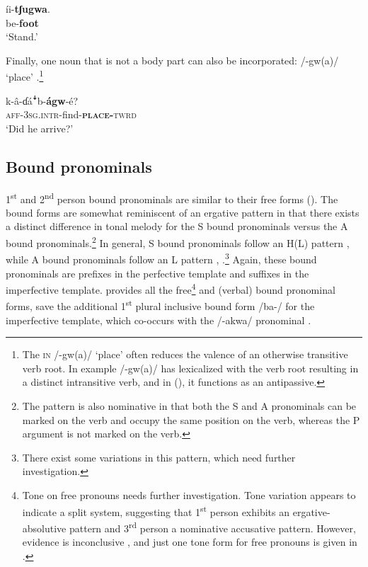 \documentclass[output=paper]{langsci/langscibook}
\begin{document}
\ea\label{ex:ahlandc:14}
\gll
íi-\textbf{tʃugwa}. \\
be{}-\textbf{foot} \\
\glt
‘Stand.’
\z

Finally, one noun that is not a body part can also be incorporated: /-gw(a)/ ‘place' .\footnote{The \textsc{in }/-gw(a)/ ‘place’ often reduces the valence of an otherwise transitive verb root. In example  /-gw(a)/ has lexicalized with the verb root resulting in a distinct intransitive verb, and in  (), it functions as an antipassive.}

\ea\label{ex:ahlandc:15}
\gll
k-â-ɗá\textsf{ꜜ}b-\textbf{ágw}{}-é? \\
\textsc{aff-3sg.intr}-find-\textbf{\textsc{place-}}\textsc{twrd} \\
\glt
‘Did he arrive?’
\z


\subsection{Bound pronominals}\label{sec:ahlandc:4.2}

 1\textsuperscript{st} and 2\textsuperscript{nd} person bound pronominals are similar to their free forms (). The bound forms are somewhat reminiscent of an ergative pattern in that there exists a distinct difference in tonal melody for the S bound pronominals versus the A bound pronominals.\footnote{The pattern is also nominative in that both the S and A pronominals can be marked on the verb and occupy the same position on the verb, whereas the P argument is not marked on the verb.} In general, S bound pronominals follow an H(L) pattern ,  while A bound pronominals follow an L pattern , .\footnote{There exist some variations in this pattern, which need further investigation.} Again, these bound pronominals are prefixes in the perfective template and suffixes in the imperfective template.  provides all the free\footnote{Tone on free pronouns needs further investigation. Tone variation appears to indicate a split system, suggesting that 1\textsuperscript{st} person exhibits an ergative-absolutive pattern and 3\textsuperscript{rd} person a nominative accusative pattern. However, evidence is inconclusive \citep{Kelly2014}, and just one tone form for free pronouns is given in .} and (verbal) bound pronominal forms, save the additional 1\textsuperscript{st} plural inclusive bound form /ba-/ for the imperfective template, which co-occurs with the /-akwa/ pronominal .
\end{document}
